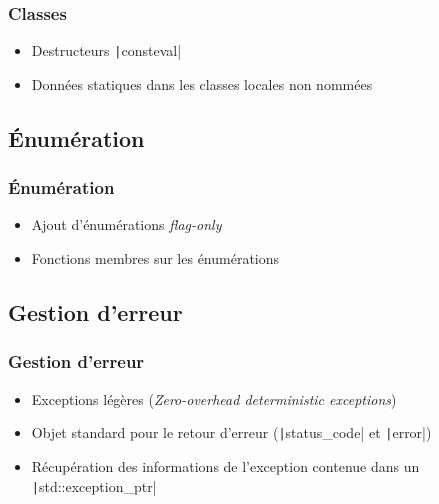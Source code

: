\documentclass[C++.tex]{subfiles}
\begin{document}
\begin{frame}[fragile]
	\frametitle{Classes}
	\begin{itemize}
		\item Destructeurs \texttt|consteval|
		\item Données statiques dans les classes locales non nommées
	\end{itemize}

\end{frame}

\subsection*{Énumération}
\begin{frame}[fragile]
	\frametitle{Énumération}
	\begin{itemize}
		\item Ajout d'énumérations \og{}\textit{flag-only}\fg{}
		\item Fonctions membres sur les énumérations
	\end{itemize}

\end{frame}

\subsection*{Gestion d'erreur}
\begin{frame}[fragile]
	\frametitle{Gestion d'erreur}
	\begin{itemize}
		\item Exceptions légères (\textit{Zero-overhead deterministic exceptions})
		\item Objet standard pour le retour d'erreur (\texttt|status_code| et \texttt|error|)
		\item Récupération des informations de l'exception contenue dans un \texttt|std::exception_ptr|
	\end{itemize}

\end{frame}
\end{document}
